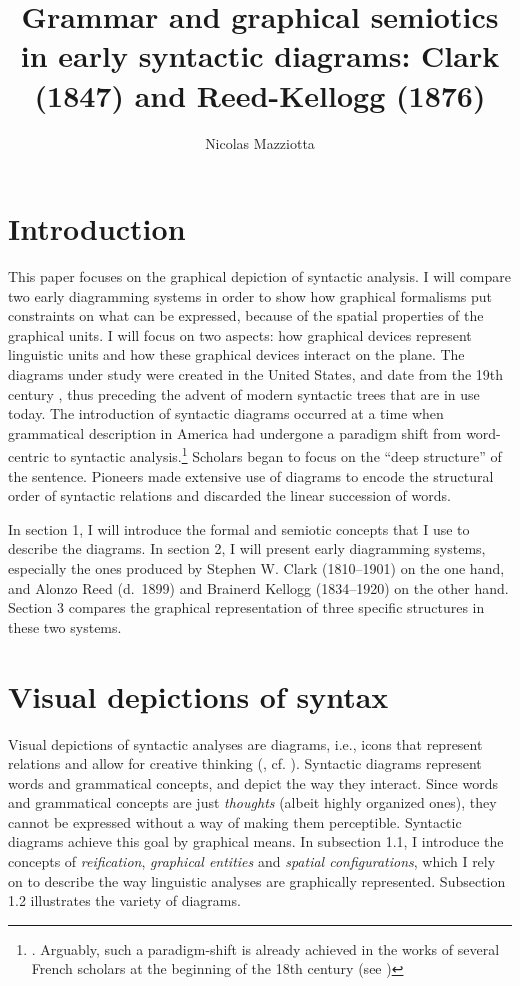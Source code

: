 \documentclass[output=paper]{langsci/langscibook}
\author{Nicolas Mazziotta\affiliation{Université de Liège}}
\title{Grammar and graphical semiotics in early syntactic diagrams: Clark (1847) and Reed-Kellogg (1876)}
\begin{document}
\maketitle

\section{Introduction} 

This paper focuses on the graphical depiction of syntactic analysis. I will compare two early diagramming systems in order to show how graphical formalisms put constraints on what can be expressed, because of the spatial properties of the graphical units. I will focus on two aspects: how graphical devices represent linguistic units and how these graphical devices interact on the plane. The diagrams under study were created in the United States, and date from the 19th century \citep{brittain_critical_1973}, thus preceding the advent of modern syntactic trees that are in use today. The introduction of syntactic diagrams occurred at a time when grammatical description in America had undergone a paradigm shift from word-centric to syntactic analysis.\footnote{\textrm{\citet[76]{aarts_handbook_2006}. Arguably, such a paradigm-shift is already achieved in the works of several French scholars at the beginning of the 18th century (see \citealt{imrenyi_how_2020})}} Scholars began to focus on the “deep structure” of the sentence. Pioneers made extensive use of diagrams to encode the structural order of syntactic relations and discarded the linear succession of words. 

In section 1, I will introduce the formal and semiotic concepts that I use to describe the diagrams. In section 2, I will present early diagramming systems, especially the ones produced by Stephen W. Clark (1810–1901) on the one hand, and Alonzo Reed (d.~1899) and Brainerd Kellogg (1834–1920) on the other hand. Section 3 compares the graphical representation of three specific structures in these two systems.

\section{Visual depictions of syntax}

Visual depictions of syntactic analyses are diagrams, i.e., icons that represent relations and allow for creative thinking (\citealt{peirce_collected_1994}, cf. \citealt[36--42]{chauvire_oeil_2008}). Syntactic diagrams represent words and grammatical concepts, and depict the way they interact. Since words and grammatical concepts are just \textit{thoughts} (albeit highly organized ones), they cannot be expressed without a way of making them perceptible. Syntactic diagrams achieve this goal by graphical means. In subsection 1.1, I introduce the concepts of \textit{reification}, \textit{graphical entities} and \textit{spatial configurations}, which I rely on to describe the way linguistic analyses are graphically represented. Subsection 1.2 illustrates the variety of diagrams. 
\end{document}
